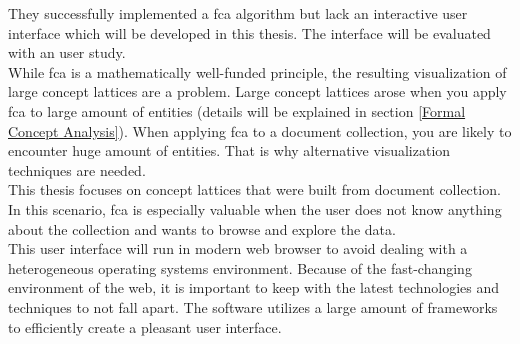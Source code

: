 \documentclass[11pt]{report}
\begin{document}
 They successfully implemented a \acrshort{fca} algorithm but lack an interactive user interface which will be developed in this thesis. The interface will be evaluated with an user study. \\
   
 While \acrshort{fca} is a mathematically well-funded principle, the resulting visualization of large concept lattices are a problem. Large concept lattices arose when you apply \acrshort{fca} to large amount of entities (details will be explained in section \ref{Formal Concept Analysis}). When applying \acrshort{fca} to a document collection, you are likely to encounter huge amount of entities. That is why alternative visualization techniques are needed. \\
 
  This thesis focuses on concept lattices that were built from document collection. In this scenario, \acrshort{fca} is especially valuable when the user does not know anything about the collection and wants to browse and explore the data. \\
  
 This user interface will run in modern web browser to avoid dealing with a heterogeneous operating systems environment. Because of the fast-changing environment of the web, it is important to keep with the latest technologies and techniques to not fall apart. The software utilizes a large amount of frameworks to efficiently create a pleasant user interface. \\
    
\end{document}
